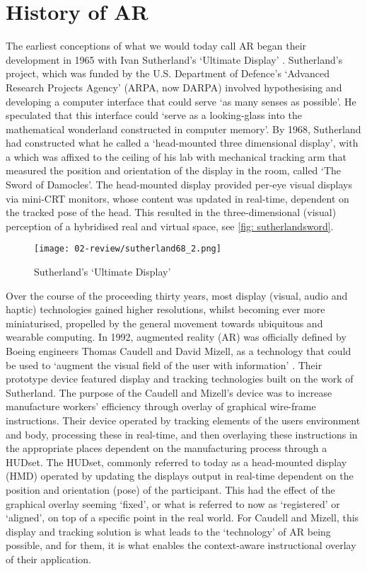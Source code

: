 \section{History of AR}\label{sec: ar-history}
The earliest conceptions of what we would today call AR began their development in 1965 with Ivan Sutherland's `Ultimate Display' \citeyearpar{sutherland1968}. Sutherland's project, which was funded by the U.S. Department of Defence's `Advanced Research Projects Agency' (ARPA, now DARPA) involved hypothesising and developing a computer interface that could serve `as many senses as possible'. He speculated that this interface could `serve as a looking-glass into the mathematical wonderland constructed in computer memory'. By 1968, Sutherland had constructed what he called a `head-mounted three dimensional display', with a which was affixed to the ceiling of his lab with mechanical tracking arm that measured the position and orientation of the display in the room, called `The Sword of Damocles'. The head-mounted display provided per-eye visual displays via mini-CRT monitors, whose content was updated in real-time, dependent on the tracked pose of the head. This resulted in the three-dimensional (visual) perception of a hybridised real and virtual space, see \autoref{fig: sutherlandsword}.

\begin{figure}[bth]
    \myfloatalign
    {\texttt{[image: 02-review/sutherland68\_2.png]}}
    \caption[Sutherland's `Ultimate Display']{Sutherland's `Ultimate Display'}\label{fig: sutherlandsword}
\end{figure}

Over the course of the proceeding thirty years, most display (visual, audio and haptic) technologies gained higher resolutions, whilst becoming ever more miniaturised, propelled by the general movement towards ubiquitous and wearable computing.  In 1992, augmented reality (AR) was officially defined by Boeing engineers Thomas Caudell and David Mizell, as a technology that could be used to `augment the visual field of the user with information' \citeyearpar{caudell1992}. Their prototype device featured display and tracking technologies built on the work of Sutherland. The purpose of the Caudell and Mizell’s device was to increase manufacture workers' efficiency through overlay of graphical wire-frame instructions. Their device operated by tracking elements of the users environment and body, processing these in real-time, and then overlaying these instructions in the appropriate places dependent on the manufacturing process through a HUDset. The HUDset, commonly referred to today as a head-mounted display (HMD) operated by updating the displays output in real-time dependent on the position and orientation (pose) of the participant. This had the effect of the graphical overlay seeming `fixed', or what is referred to now as `registered' or `aligned', on top of a specific point in the real world. For Caudell and Mizell, this display and tracking solution is what leads to the `technology' of AR being possible, and for them, it is what enables the context-aware instructional overlay of their application.

